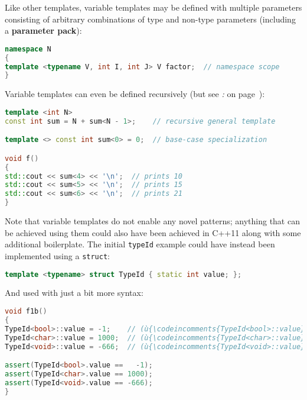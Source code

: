 \noindent Like other templates, variable templates may be defined with multiple
parameters consisting of arbitrary combinations of type and non-type
parameters (including a \textbf{parameter pack}):

\begin{lstlisting}[language=C++]
namespace N
{
template <typename V, int I, int J> V factor;  // namespace scope
}
\end{lstlisting}

\noindent Variable templates can even be defined recursively (but see
{\it{}:} {\it{}} on page~\pageref{recursive-variable-template-initializations-require-const-or-constexpr}):

\begin{lstlisting}[language=C++]
template <int N>
const int sum = N + sum<N - 1>;    // recursive general template

template <> const int sum<0> = 0;  // base-case specialization

void f()
{
std::cout << sum<4> << '\n';  // prints 10
std::cout << sum<5> << '\n';  // prints 15
std::cout << sum<6> << '\n';  // prints 21
}
\end{lstlisting}

\noindent Note that variable templates do not enable any novel patterns;
anything that can be achieved using them could also have been achieved
in C++11 along with some additional boilerplate. The initial
\texttt{typeId} example could have instead been implemented using a
\texttt{struct}:

\begin{lstlisting}[language=C++]
template <typename> struct TypeId { static int value; };
\end{lstlisting}

\noindent And used with just a bit more syntax:

\begin{lstlisting}[language=C++]
void f1b()
{
TypeId<bool>::value = -1;    // (ù{\codeincomments{TypeId<bool>::value}}ù) is an (ù{\codeincomments{int}}ù).
TypeId<char>::value = 1000;  // (ù{\codeincomments{TypeId<char>::value}}ù) is an (ù{\codeincomments{int}}ù).
TypeId<void>::value = -666;  // (ù{\codeincomments{TypeId<void>::value}}ù) is an (ù{\codeincomments{int}}ù).

assert(TypeId<bool>.value ==   -1);
assert(TypeId<char>.value == 1000);
assert(TypeId<void>.value == -666);
}
\end{lstlisting}


